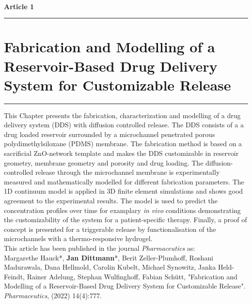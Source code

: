 \ \vspace{1cm} \\
\Large {\bf Article 1}
\normalsize
\vspace{0.3cm}
\hrule
\section*{\Large \centering Fabrication and Modelling of a Reservoir-Based Drug Delivery
System for Customizable Release}
\vspace{0.3cm}
\hrule
\vspace{1.5cm}

This Chapter presents the fabrication, characterization and modelling of a drug delivery system (DDS) with diffusion controlled release. The DDS consists of a a drug loaded reservoir surrounded by a microchannel penetrated porous polydimethylsiloxane (PDMS) membrane. The fabrication method is based on a sacrificial ZnO-network template and makes the DDS customizable in reservoir geometry, membrane geometry and porosity and drug loading. The diffusion-controlled release through the microchannel membrane is experimentally measured and mathematically modelled for different fabrication parameters. The 1D continuum model is applied in 3D finite element simulations and shows good agreement to the experimental results. The model is used to predict the concentration profiles over time for examplary \textit{in vivo} conditions demonstrating the customizability of the system for a patient-specific therapy. Finally, a proof of concept is presented for a triggerable release by functionalisation of the microchannels with a thermo-responsive hydrogel. \\

This article has been published in the journal \textit{Pharmaceutics} as: \vspace{0.3cm} \\ 
{\small Margarethe Hauck*, \textbf{Jan Dittmann}*, Berit Zeller-Plumhoff, Roshani Madurawala, Dana Hellmold, Carolin Kubelt, Michael Synowitz, Janka Held-Feindt, Rainer Adelung, Stephan Wulfinghoff, Fabian Schütt, "Fabrication and Modelling of a Reservoir-Based Drug Delivery System for Customizable Release". \textit{Pharmaceutics}, (2022) 14(4):777.}\\ 

